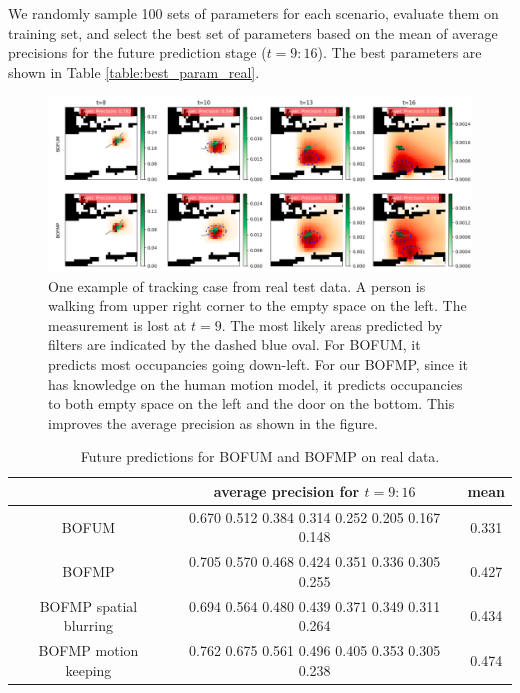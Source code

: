 We randomly sample 100 sets of parameters for each scenario, evaluate them on training set, and select the best set of parameters based on the mean of average precisions for the future prediction stage ($t=9:16$). The best parameters are shown in Table \ref{table:best_param_real}.

\begin{figure}[H]
  \centering
    \includegraphics[width=\textwidth]{figures/tracking_sample_for_real_data_1.png}
    \caption[One example of tracking case from real test data.]{One example of tracking case from real test data. A person is walking from upper right corner to the empty space on the left. The measurement is lost at $t=9$. The most likely areas predicted by filters are indicated by the dashed blue oval. For BOFUM, it predicts most occupancies going down-left. For our BOFMP, since it has knowledge on the human motion model, it predicts occupancies to both empty space on the left and the door on the bottom. This improves the average precision as shown in the figure. }
    \label{fig:tracking_real_data}
\end{figure}

\begin{table}[H]
\footnotesize
\centering  
\begin{tabularx}{.8\textwidth}{c|c|c}
    \hline
    & average precision for $t=9:16$ & mean \\ \hline \hline
    BOFUM & 0.670   0.512  0.384  0.314  0.252  0.205  0.167  0.148  & 0.331   \\ \hline
    BOFMP & 0.705  0.570   0.468  0.424  0.351  0.336  0.305  0.255 & 0.427  \\
    \scriptsize{BOFMP spatial blurring} & 0.694  0.564  0.480   0.439  0.371  0.349  0.311  0.264 &  0.434  \\
    \scriptsize{BOFMP motion keeping} &  0.762  0.675  0.561  0.496  0.405  0.353  0.305  0.238 & 0.474  \\
   \hline
  \end{tabularx}
\caption{Future predictions for BOFUM and BOFMP on real data.}
\label{table:real_test_data}
\end{table}

